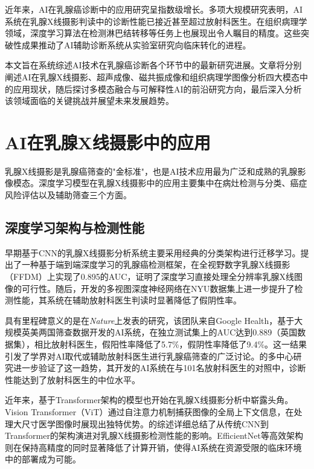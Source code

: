 \documentclass[12pt,a4paper]{article}
\begin{document}
近年来，AI在乳腺癌诊断中的应用研究呈指数级增长。多项大规模研究表明，AI系统在乳腺X线摄影判读中的诊断性能已接近甚至超过放射科医生\citep{mckinney2020international, rodriguez2019standalone}。在组织病理学领域，深度学习算法在检测淋巴结转移等任务上也展现出令人瞩目的精度\citep{bejnordi2017diagnostic}。这些突破性成果推动了AI辅助诊断系统从实验室研究向临床转化的进程。

本文旨在系统综述AI技术在乳腺癌诊断各个环节中的最新研究进展。文章将分别阐述AI在乳腺X线摄影、超声成像、磁共振成像和组织病理学图像分析四大模态中的应用现状，随后探讨多模态融合与可解释性AI的前沿研究方向，最后深入分析该领域面临的关键挑战并展望未来发展趋势。

\section{AI在乳腺X线摄影中的应用}

乳腺X线摄影是乳腺癌筛查的"金标准"，也是AI技术应用最为广泛和成熟的乳腺影像模态。深度学习模型在乳腺X线摄影中的应用主要集中在病灶检测与分类、癌症风险评估以及辅助筛查三个方面。

\subsection{深度学习架构与检测性能}

早期基于CNN的乳腺X线摄影分析系统主要采用经典的分类架构进行迁移学习。\citet{shen2019deep}提出了一种基于端到端深度学习的乳腺癌检测框架，在全视野数字乳腺X线摄影（FFDM）上实现了0.895的AUC，证明了深度学习直接处理全分辨率乳腺X线图像的可行性。随后，\citet{wu2020deep}开发的多视图深度神经网络在NYU数据集上进一步提升了检测性能，其系统在辅助放射科医生判读时显著降低了假阴性率。

具有里程碑意义的是\citet{mckinney2020international}在\textit{Nature}上发表的研究，该团队来自Google Health，基于大规模英美两国筛查数据开发的AI系统，在独立测试集上的AUC达到0.889（英国数据集），相比放射科医生，假阳性率降低了5.7\%，假阴性率降低了9.4\%。这一结果引发了学界对AI取代或辅助放射科医生进行乳腺癌筛查的广泛讨论。\citet{rodriguez2019standalone}的多中心研究进一步验证了这一趋势，其开发的AI系统在与101名放射科医生的对照中，诊断性能达到了放射科医生的中位水平。

近年来，基于Transformer架构的模型也开始在乳腺X线摄影分析中崭露头角。Vision Transformer（ViT）\citep{dosovitskiy2021image}通过自注意力机制捕获图像的全局上下文信息，在处理大尺寸医学图像时展现出独特优势。\citet{wang2024mammography}的综述详细总结了从传统CNN到Transformer的架构演进对乳腺X线摄影检测性能的影响。EfficientNet\citep{tan2019efficientnet}等高效架构则在保持高精度的同时显著降低了计算开销，使得AI系统在资源受限的临床环境中的部署成为可能。
\end{document}
